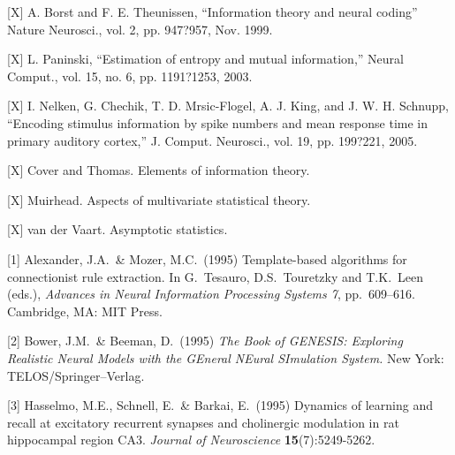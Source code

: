 \documentclass{article}
\begin{document}
[X] A. Borst and F. E. Theunissen, ``Information theory and neural coding''
Nature Neurosci., vol. 2, pp. 947?957, Nov. 1999.

[X] L. Paninski, ``Estimation of entropy and mutual information,'' Neural
Comput., vol. 15, no. 6, pp. 1191?1253, 2003.

[X] I. Nelken, G. Chechik, T. D. Mrsic-Flogel, A. J. King, and J. W. H.
Schnupp, ``Encoding stimulus information by spike numbers and mean
response time in primary auditory cortex,'' J. Comput. Neurosci., vol.
19, pp. 199?221, 2005.

[X] Cover and Thomas.  Elements of information theory.

[X]  Muirhead.  Aspects of multivariate statistical theory.

[X] van der Vaart.  Asymptotic statistics.

[1] Alexander, J.A.\ \& Mozer, M.C.\ (1995) Template-based algorithms
for connectionist rule extraction. In G.\ Tesauro, D.S.\ Touretzky and
T.K.\ Leen (eds.), {\it Advances in Neural Information Processing
  Systems 7}, pp.\ 609--616. Cambridge, MA: MIT Press.

[2] Bower, J.M.\ \& Beeman, D.\ (1995) {\it The Book of GENESIS:
  Exploring Realistic Neural Models with the GEneral NEural SImulation
  System.}  New York: TELOS/Springer--Verlag.

[3] Hasselmo, M.E., Schnell, E.\ \& Barkai, E.\ (1995) Dynamics of
learning and recall at excitatory recurrent synapses and cholinergic
modulation in rat hippocampal region CA3. {\it Journal of
  Neuroscience} {\bf 15}(7):5249-5262.
\end{document}

